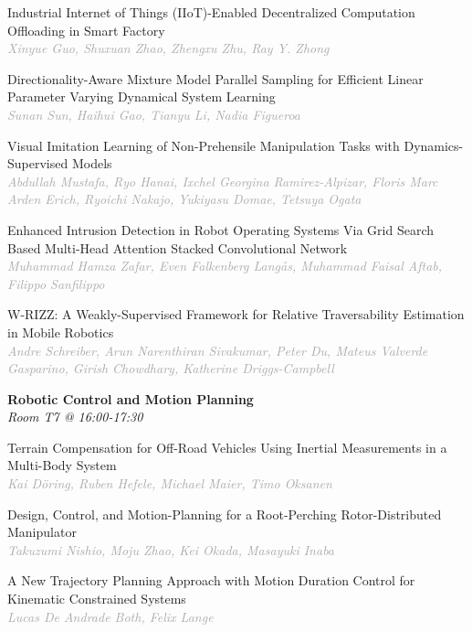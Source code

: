 \begin{multicols*}{2}
\small Industrial Internet of Things (IIoT)-Enabled Decentralized Computation Offloading in Smart Factory\\ 
\footnotesize \textcolor{darkgray}{\textit{Xinyue Guo, Shuxuan  Zhao, Zhengxu  Zhu, Ray Y.  Zhong}}

\small Directionality-Aware Mixture Model Parallel Sampling for Efficient Linear Parameter Varying Dynamical System Learning\\ 
\footnotesize \textcolor{darkgray}{\textit{Sunan Sun, Haihui  Gao, Tianyu  Li, Nadia  Figueroa}}

\small Visual Imitation Learning of Non-Prehensile Manipulation Tasks with Dynamics-Supervised Models\\ 
\footnotesize \textcolor{darkgray}{\textit{Abdullah Mustafa, Ryo  Hanai, Ixchel Georgina  Ramirez-Alpizar, Floris Marc Arden  Erich, Ryoichi  Nakajo, Yukiyasu  Domae, Tetsuya  Ogata}}

\small Enhanced Intrusion Detection in Robot Operating Systems Via Grid Search Based Multi-Head Attention Stacked Convolutional Network\\ 
\footnotesize \textcolor{darkgray}{\textit{Muhammad Hamza Zafar, Even  Falkenberg Langås, Muhammad Faisal  Aftab, Filippo  Sanfilippo}}

\small W-RIZZ: A Weakly-Supervised Framework for Relative Traversability Estimation in Mobile Robotics\\ 
\footnotesize \textcolor{darkgray}{\textit{Andre Schreiber, Arun Narenthiran  Sivakumar, Peter  Du, Mateus  Valverde Gasparino, Girish  Chowdhary, Katherine  Driggs-Campbell}}

\normalsize \textbf{Robotic Control and Motion Planning}\\
\small \textit{Room T7 @ 16:00-17:30}

\small Terrain Compensation for Off-Road Vehicles Using Inertial Measurements in a Multi-Body System\\ 
\footnotesize \textcolor{darkgray}{\textit{Kai Döring, Ruben  Hefele, Michael  Maier, Timo  Oksanen}}

\small Design, Control, and Motion-Planning for a Root-Perching Rotor-Distributed Manipulator\\ 
\footnotesize \textcolor{darkgray}{\textit{Takuzumi Nishio, Moju  Zhao, Kei  Okada, Masayuki  Inaba}}

\small A New Trajectory Planning Approach with Motion Duration Control for Kinematic Constrained Systems\\ 
\footnotesize \textcolor{darkgray}{\textit{Lucas De Andrade Both, Felix  Lange}}


\end{multicols*}
